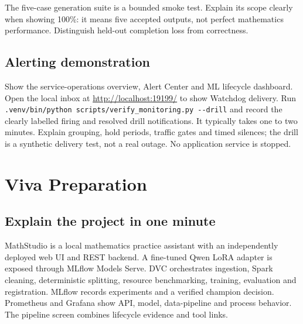 \documentclass[11pt,a4paper]{article}
\begin{document}
The five-case generation suite is a bounded smoke test. Explain its scope clearly when showing 100\%: it means five accepted outputs, not perfect mathematics performance. Distinguish held-out completion loss from correctness.

\subsection*{Alerting demonstration}
Show the service-operations overview, Alert Center and ML lifecycle dashboard. Open the local inbox at \url{http://localhost:19199/} to show Watchdog delivery. Run \texttt{.\allowbreak{}venv/\allowbreak{}bin/\allowbreak{}python scripts/\allowbreak{}verify\_\allowbreak{}monitoring.\allowbreak{}py -\allowbreak{}-\allowbreak{}drill} and record the clearly labelled firing and resolved drill notifications. It typically takes one to two minutes. Explain grouping, hold periods, traffic gates and timed silences; the drill is a synthetic delivery test, not a real outage. No application service is stopped.

\clearpage
\section*{Viva Preparation}
\subsection*{Explain the project in one minute}
MathStudio is a local mathematics practice assistant with an independently deployed web UI and REST backend. A fine-tuned Qwen LoRA adapter is exposed through MLflow Models Serve. DVC orchestrates ingestion, Spark cleaning, deterministic splitting, resource benchmarking, training, evaluation and registration. MLflow records experiments and a verified champion decision. Prometheus and Grafana show API, model, data-pipeline and process behavior. The pipeline screen combines lifecycle evidence and tool links.
\end{document}
